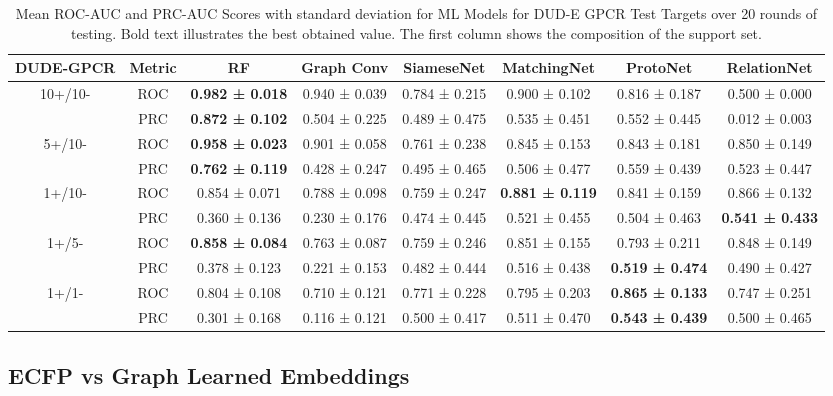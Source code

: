 \documentclass[journal=acscii,manuscript=article]{achemso}
\begin{document}
\begin{table}
\caption{Mean ROC-AUC and PRC-AUC Scores with standard deviation for ML Models for DUD-E GPCR Test Targets over 20 rounds of testing. Bold text illustrates the best obtained value. The first column shows the composition of the support set.}
\centering
\begin{tabular}{@{}cccccccc@{}}
\hline
\textbf{DUDE-GPCR} & \textbf{Metric} & \textbf{RF} & \textbf{Graph Conv} & \textbf{SiameseNet} & \textbf{MatchingNet} & \textbf{ProtoNet} & \textbf{RelationNet} \\
\hline
10+/10- & ROC & \textbf{0.982 ± 0.018} & 0.940 ± 0.039 & 0.784 ± 0.215 & 0.900 ± 0.102 & 0.816 ± 0.187 & 0.500 ± 0.000 \\ & PRC & \textbf{0.872 ± 0.102} & 0.504 ± 0.225 & 0.489 ± 0.475 & 0.535 ± 0.451 & 0.552 ± 0.445 & 0.012 ± 0.003\\
\hline
5+/10- & ROC & \textbf{0.958 ± 0.023} & 0.901 ± 0.058 & 0.761 ± 0.238 & 0.845 ± 0.153 & 0.843 ± 0.181 & 0.850 ± 0.149 \\ & PRC & \textbf{0.762 ± 0.119} & 0.428 ± 0.247 & 0.495 ± 0.465 & 0.506 ± 0.477 & 0.559 ± 0.439 & 0.523 ± 0.447\\
\hline
1+/10- & ROC & 0.854 ± 0.071 & 0.788 ± 0.098 & 0.759 ± 0.247 & \textbf{0.881 ± 0.119} & 0.841 ± 0.159 & 0.866 ± 0.132 \\ & PRC & 0.360 ± 0.136 & 0.230 ± 0.176 & 0.474 ± 0.445 & 0.521 ± 0.455 & 0.504 ± 0.463 & \textbf{0.541 ± 0.433}\\
\hline
1+/5- & ROC & \textbf{0.858 ± 0.084} & 0.763 ± 0.087 & 0.759 ± 0.246 & 0.851 ± 0.155 & 0.793 ± 0.211 & 0.848 ± 0.149 \\ & PRC & 0.378 ± 0.123 & 0.221 ± 0.153 & 0.482 ± 0.444 & 0.516 ± 0.438 & \textbf{0.519 ± 0.474} & 0.490 ± 0.427\\
\hline
1+/1- & ROC & 0.804 ± 0.108 & 0.710 ± 0.121 & 0.771 ± 0.228 & 0.795 ± 0.203 & \textbf{0.865 ± 0.133} & 0.747 ± 0.251 \\ & PRC & 0.301 ± 0.168 & 0.116 ± 0.121 & 0.500 ± 0.417 & 0.511 ± 0.470 & \textbf{0.543 ± 0.439} & 0.500 ± 0.465\\
\hline
\end{tabular}
\label{table:dude-mean}
\end{table}

\subsection{ECFP vs Graph Learned Embeddings}
\end{document}
